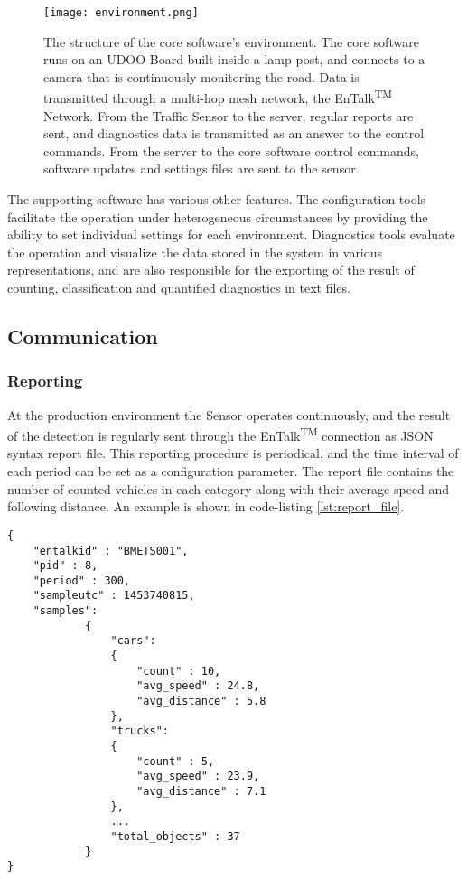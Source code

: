 \begin{figure}[!h]
	\centering
	\texttt{[image: environment.png]}
	\caption[The environment of the core software]{The structure of the core software's environment. The core software runs on an UDOO Board built inside a lamp post, and connects to a camera that is continuously monitoring the road. Data is transmitted through a multi-hop mesh network, the EnTalk\textsuperscript{TM} Network. From the Traffic Sensor to the server, regular reports are sent, and diagnostics data is transmitted as an answer to the control commands. From the server to the core software control commands, software updates and settings files are sent to the sensor. \label{fig:environment}}
\end{figure}

The supporting software has various other features.
The configuration tools facilitate the operation under heterogeneous circumstances by providing the ability to set individual settings for each environment.
Diagnostics tools evaluate the operation and visualize the data stored in the system in various representations, and are also responsible for the exporting of the result of counting, classification and quantified diagnostics in text files.
\subsection{Communication}\label{sec:communication}
\subsubsection{Reporting}\label{sec:reporting}
At the production environment the Sensor operates continuously, and the result of the detection is regularly sent through the EnTalk\textsuperscript{TM} connection as JSON syntax report file. 
This reporting procedure is periodical, and the time interval of each period can be set as a configuration parameter.
The report file contains the number of counted vehicles in each category along with their average speed and following distance.
An example is shown in code-listing \ref{lst:report_file}.

\begin{lstlisting}[frame=single,float=!ht,caption={Part of a report file. The result of the counting is sent as a JSON syntax file, including the number of vehicles detected in each category.},label=lst:report_file]
{
	"entalkid" : "BMETS001",
	"pid" : 8,
	"period" : 300,
	"sampleutc" : 1453740815,
	"samples":
			{
				"cars":
				{
					"count" : 10,
					"avg_speed" : 24.8,
					"avg_distance" : 5.8
				},
				"trucks":
				{
					"count" : 5,
					"avg_speed" : 23.9,
					"avg_distance" : 7.1
				},
				...
				"total_objects" : 37
			}
}
\end{lstlisting}

